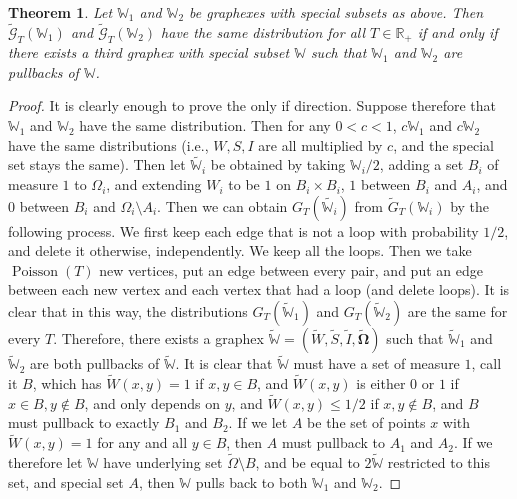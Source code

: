 \documentclass{amsart}
\numberwithin{equation}{section}
\numberwithin{figure}{section}
\newtheorem{theorem}{Theorem}[section]
\theoremstyle{definition}
\theoremstyle{remark}
\DeclareMathOperator{\Poisson}{Poisson}
\newcommand{\bOmega}{{\mathbf{\Omega}}}
\newcommand{\RR}{\mathbb{R}}
\newcommand{\cW}{\mathbb{W}}
\newcommand{\cG}{\mathcal{G}}
\begin{document}
\begin{theorem}
Let $\cW_1$ and $\cW_2$ be graphexes with special subsets as above. Then
$\widetilde{\cG}_T(\cW_1)$ and $\widetilde{\cG}_T(\cW_2)$ have the same
distribution for all $T \in \RR_+$ if and only if there exists a third
graphex with special subset $\cW$ such that $\cW_1$ and $\cW_2$ are pullbacks
of $\cW$.
\end{theorem}

\begin{proof}
It is clearly enough to prove the only if direction. Suppose therefore that
$\cW_1$ and $\cW_2$ have the same distribution. Then for any $0<c<1$,
$c\cW_1$ and $c \cW_2$ have the same distributions (i.e., $W,S,I$ are all
multiplied by $c$, and the special set stays the same). Then let
$\widetilde{\cW_i}$ be obtained by taking $ \cW_i/2$, adding a set $B_i$ of
measure $1$ to $\Omega_i$, and extending $W_i$ to be $1$ on $B_i \times B_i$,
$1$ between $B_i$ and $A_i$, and $0$ between $B_i$ and $\Omega_i \setminus
A_i$. Then we can obtain $G_T(\widetilde{\cW_i})$ from
$\widetilde{G}_T(\cW_i)$ by the following process. We first keep each edge
that is not a loop with probability $1/2$, and delete it otherwise,
independently. We keep all the loops. Then we take $\Poisson(T)$ new
vertices, put an edge between every pair, and put an edge between each new
vertex and each vertex that had a loop (and delete loops). It is clear that
in this way, the distributions $G_T(\widetilde{\cW}_1)$ and
$G_T(\widetilde{\cW}_2)$ are the same for every $T$. Therefore, there exists
a graphex
$\widetilde{\cW}=(\widetilde{W},\widetilde{S},\widetilde{I},\widetilde{\bOmega})$
such that $\widetilde{\cW}_1$ and $\widetilde{\cW}_2$ are both pullbacks of
$\widetilde{\cW}$. It is clear that $\widetilde{\cW}$ must have a set of
measure $1$, call it $B$, which has $\widetilde{W}(x,y)=1$ if $x,y \in B$,
and $\widetilde{W}(x,y)$ is either $0$ or $1$ if $x \in B, y \notin B$, and
only depends on $y$, and $\widetilde{W}(x,y) \le 1/2$ if $x,y \notin B$, and
$B$ must pullback to exactly $B_1$ and $B_2$. If we let $A$ be the set of
points $x$ with $\widetilde{W}(x,y)=1$ for any and all $y \in B$, then $A$
must pullback to $A_1$ and $A_2$. If we therefore let $\cW$ have underlying
set $\widetilde{\Omega} \setminus B$, and be equal to $2\widetilde{\cW}$
restricted to this set, and special set $A$, then $\cW$ pulls back to both
$\cW_1$ and $\cW_2$.
\end{proof}
\end{document}
